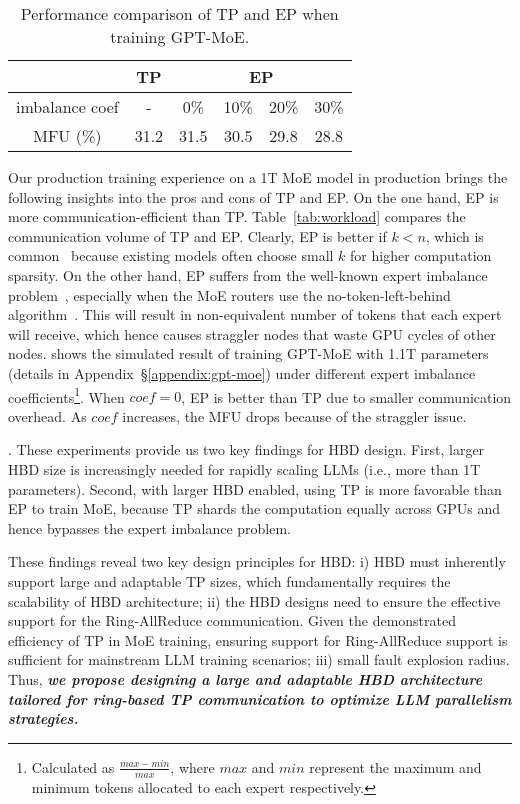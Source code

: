 \begin{table}[h!t]
    \vspace{-1ex}
    \centering
    \begin{tabular}{cccccc}
        \toprule
        & TP & \multicolumn{4}{c}{EP} \\
        \hline
        imbalance coef & - & 0\% & 10\% & 20\% & 30\% \\
        MFU (\%) & 31.2 & 31.5 & 30.5 & 29.8 & 28.8 \\
        \bottomrule
    \end{tabular}
    \caption{Performance comparison of TP and EP when training GPT-MoE.}
    \label{tab:ep-imbalance}
    \vspace{-2em}
\end{table}


Our production training experience on a 1T MoE model in production brings the following insights into the pros and cons of TP and EP.
On the one hand, EP is more communication-efficient than TP. Table~\ref{tab:workload} compares the communication volume of TP and EP. Clearly, EP is better if $k<n$, which is common~\cite{deepseek_v3} because existing models often choose small $k$ for higher computation sparsity.
On the other hand, EP suffers from the well-known expert imbalance problem~\cite{sigcomm2023_janus}, especially when the MoE routers use the no-token-left-behind algorithm~\cite{deepseek_v3, megablocks, glam}. This will result in non-equivalent number of tokens that each expert will receive, which hence causes straggler nodes that waste GPU cycles of other nodes. 
 shows the simulated result of training GPT-MoE with 1.1T parameters (details in Appendix~\S\ref{appendix:gpt-moe}) under different expert imbalance coefficients\footnote{Calculated as $\frac{max - min}{max}$, where $max$ and $min$ represent the maximum and minimum tokens allocated to each expert respectively.}. When $coef=0$, EP is better than TP due to smaller communication overhead. As $coef$ increases, the MFU drops because of the straggler issue.


. These experiments provide us two key findings for HBD design. First, larger HBD size is increasingly needed for rapidly scaling LLMs (i.e., more than 1T parameters). Second, with larger HBD enabled, using TP is more favorable than EP to train MoE, because TP shards the computation equally across GPUs and hence bypasses the expert imbalance problem. 

These findings reveal two key design principles for HBD:  i) HBD must inherently support large and adaptable TP sizes, which fundamentally requires the scalability of HBD architecture; ii) the HBD designs need to ensure the effective support for the Ring-AllReduce communication. Given the demonstrated efficiency of TP in MoE training, ensuring support for Ring-AllReduce support is sufficient for mainstream LLM training scenarios; iii) small fault explosion radius. Thus, \textit{\textbf{we propose designing a large and adaptable HBD architecture tailored for ring-based TP communication to optimize LLM parallelism strategies.}}



